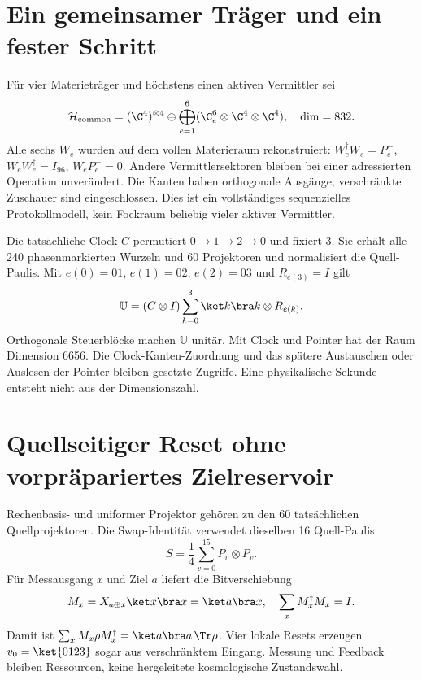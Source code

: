 \section{Ein gemeinsamer Träger und ein fester Schritt}
Für vier Materieträger und höchstens einen aktiven Vermittler sei
\begin{equation}
\mathcal H_{\mathrm{common}}=(\C^4)^{\otimes4}\oplus
\bigoplus_{e=1}^{6}(\C^6_e\otimes\C^4\otimes\C^4),\quad \dim=832.
\end{equation}
Alle sechs $W_e$ wurden auf dem vollen Materieraum rekonstruiert:
$W_e^\dagger W_e=P^-_e$, $W_eW_e^\dagger=I_{96}$, $W_eP^+_e=0$.
Andere Vermittlersektoren bleiben bei einer adressierten Operation unverändert. Die Kanten haben orthogonale Ausgänge; verschränkte Zuschauer sind eingeschlossen. Dies ist ein vollständiges sequenzielles Protokollmodell, kein Fockraum beliebig vieler aktiver Vermittler.

Die tatsächliche Clock $C$ permutiert $0\to1\to2\to0$ und fixiert 3. Sie erhält alle 240 phasenmarkierten Wurzeln und 60 Projektoren und normalisiert die Quell-Paulis. Mit $e(0)=01$, $e(1)=02$, $e(2)=03$ und $R_{e(3)}=I$ gilt
\begin{equation}
\mathbb U=(C\otimes I)\sum_{k=0}^{3}\ket k\bra k\otimes R_{e(k)}.
\end{equation}
Orthogonale Steuerblöcke machen $\mathbb U$ unitär. Mit Clock und Pointer hat der Raum Dimension 6656. Die Clock-Kanten-Zuordnung und das spätere Austauschen oder Auslesen der Pointer bleiben gesetzte Zugriffe. Eine physikalische Sekunde entsteht nicht aus der Dimensionszahl.

\section{Quellseitiger Reset ohne vorpräpariertes Zielreservoir}
Rechenbasis- und uniformer Projektor gehören zu den 60 tatsächlichen Quellprojektoren. Die Swap-Identität verwendet dieselben 16 Quell-Paulis:
\begin{equation}
S=\frac14\sum_{v=0}^{15}P_v\otimes P_v.
\end{equation}
Für Messausgang $x$ und Ziel $a$ liefert die Bitverschiebung
\begin{equation}
M_x=X_{a\oplus x}\ket x\bra x=\ket a\bra x,\quad
\sum_xM_x^\dagger M_x=I.
\end{equation}
Damit ist $\sum_xM_x\rho M_x^\dagger=\ket a\bra a\,\Tr\rho$. Vier lokale Resets erzeugen $v_0=\ket{0123}$ sogar aus verschränktem Eingang. Messung und Feedback bleiben Ressourcen, keine hergeleitete kosmologische Zustandswahl.

